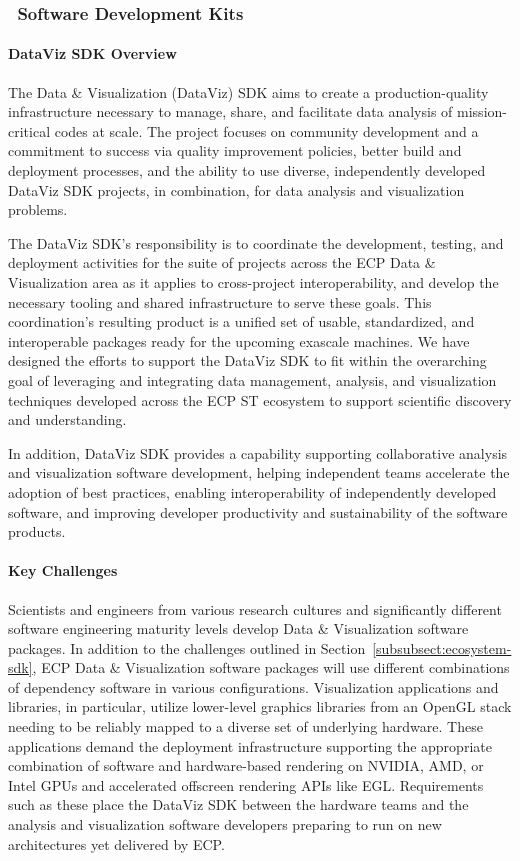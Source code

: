 \subsubsection{ \dataviz\ Software Development Kits} 

\paragraph{DataViz SDK Overview}
The Data \& Visualization (DataViz) SDK aims to create a production-quality infrastructure necessary to manage, share, and facilitate data analysis of mission-critical codes at scale. The project focuses on community development and a commitment to success via quality improvement policies, better build and deployment processes, and the ability to use diverse, independently developed DataViz SDK projects, in combination, for data analysis and visualization problems.

The DataViz SDK's responsibility is to coordinate the development, testing, and deployment activities for the suite of projects across the ECP Data \& Visualization area as it applies to cross-project interoperability, and develop the necessary tooling and shared infrastructure to serve these goals. This coordination's resulting product is a unified set of usable, standardized, and interoperable packages ready for the upcoming exascale machines. We have designed the efforts to support the DataViz SDK to fit within the overarching goal of leveraging and integrating data management, analysis, and visualization techniques developed across the ECP ST ecosystem to support scientific discovery and understanding.

In addition, DataViz SDK provides a capability supporting collaborative analysis and visualization software development, helping independent teams accelerate the adoption of best practices, enabling interoperability of independently developed software, and improving developer productivity and sustainability of the software products.

\paragraph{Key Challenges}
Scientists and engineers from various research cultures and significantly different software engineering maturity levels develop Data \& Visualization software packages. In addition to the challenges outlined in Section~\ref{subsubsect:ecosystem-sdk}, ECP Data \& Visualization software packages will use different combinations of dependency software in various configurations. Visualization applications and libraries, in particular, utilize lower-level graphics libraries from an OpenGL stack needing to be reliably mapped to a diverse set of underlying hardware.  These applications demand the deployment infrastructure supporting the appropriate combination of software and hardware-based rendering on NVIDIA, AMD, or Intel GPUs and accelerated offscreen rendering APIs like EGL.  Requirements such as these place the DataViz SDK between the hardware teams and the analysis and visualization software developers preparing to run on new architectures yet delivered by ECP.


